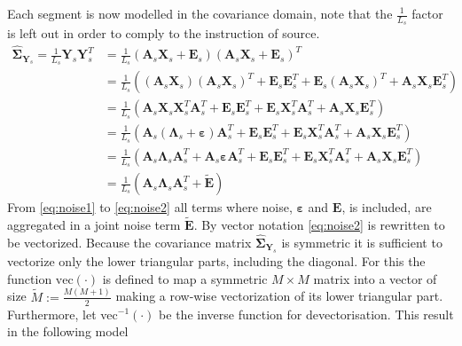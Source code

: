 Each segment is now modelled in the covariance domain, note that the $\frac{1}{L_s}$ factor is left out in order to comply to the instruction of source. 
\begin{align} 
\widehat{\boldsymbol{\Sigma}}_{\mathbf{Y}_s} = \frac{1}{L_s}\mathbf{Y}_s \mathbf{Y}_s^T &= \frac{1}{L_s} \left( \mathbf{A}_s \mathbf{X}_s + \mathbf{E}_s \right) \left( \mathbf{A}_s \mathbf{X}_s + \mathbf{E}_s\right)^T \nonumber \\ 
 &= \frac{1}{L_s} \left( (\textbf{A}_s\textbf{X}_s)(\textbf{A}_s\textbf{X}_s)^T + \textbf{E}_s \textbf{E}_s^T + \textbf{E}_s (\textbf{A}_s\textbf{X}_s)^T + \textbf{A}_s\textbf{X}_s \textbf{E}_s^T \right) \nonumber \\
&= \frac{1}{L_s} \left( \textbf{A}_s\textbf{X}_s \textbf{X}_s^T \textbf{A}_s^T + \textbf{E}_s \textbf{E}_s^T + \textbf{E}_s \textbf{X}_s^T \textbf{A}_s^T + \textbf{A}_s\textbf{X}_s \textbf{E}_s^T \right) \nonumber \\
&=  \frac{1}{L_s} \left( \textbf{A}_s(\boldsymbol{\Lambda}_s +\boldsymbol{\varepsilon}) \textbf{A}_s^T + \textbf{E}_s \textbf{E}_s^T + \textbf{E}_s \textbf{X}_s^T \textbf{A}_s^T + \textbf{A}_s\textbf{X}_s \textbf{E}_s^T \right) \nonumber \\
&= \frac{1}{L_s} \left( \textbf{A}_s \boldsymbol{\Lambda}_s \textbf{A}_s^T + \textbf{A}_s \boldsymbol{\varepsilon} \textbf{A}_s^T + \textbf{E}_s \textbf{E}_s^T + \textbf{E}_s \textbf{X}_s^T \textbf{A}_s^T + \textbf{A}_s\textbf{X}_s \textbf{E}_s^T\right) \label{eq:noise1} \\
&= \frac{1}{L_s} \left( \textbf{A}_s \boldsymbol{\Lambda}_s \textbf{A}_s^T + \widetilde{\textbf{E}} \right) \label{eq:noise2}
\end{align}
From \eqref{eq:noise1} to \eqref{eq:noise2} all terms where noise, $\boldsymbol{\varepsilon}$ and $\mathbf{E}$, is included, are aggregated in a joint noise term $\widetilde{\textbf{E}}$. 
By vector notation \eqref{eq:noise2} is rewritten to be vectorized. 
Because the covariance matrix $\widehat{\boldsymbol{\Sigma}}_{\mathbf{Y}_s}$ is symmetric it is sufficient to vectorize only the lower triangular parts, including the diagonal. 
For this the function $\text{vec}(\cdot)$ is defined to map a symmetric $M \times M$ matrix into a vector of size $\widetilde{M} := \frac{M(M+1)}{2}$ making a row-wise vectorization of its lower triangular part. 
Furthermore, let vec$^{-1}(\cdot)$ be the inverse function for devectorisation. 
This result in the following model 
